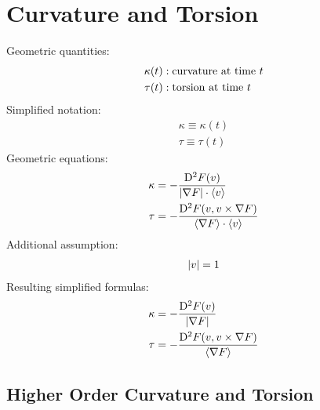 \section{Curvature and Torsion}


Geometric quantities:
\begin{subequations}
\begin{align}
\kappa( t )  &:  \text{curvature at time $ t $}\\
\tau( t )    &:  \text{torsion at time $ t $}
\end{align}
\end{subequations}
Simplified notation:
\begin{subequations}
\begin{align}
\kappa  \equiv  \kappa( t )\\
\tau    \equiv  \tau( t )
\end{align}
\end{subequations}
Geometric equations:
\begin{subequations}
\begin{align}
\kappa   &=   -\frac{ \mathrm{D}^{ 2 }F( v ) }{ \lvert  \nabla F  \rvert \cdot \langle  v  \rangle }\\
\tau     &=   -\frac{ \mathrm{D}^{ 2 }F( v, v \times \nabla F ) }{ \langle  \nabla F  \rangle \cdot \langle  v  \rangle }
\end{align}
\end{subequations}
Additional assumption:
\begin{align}
    \lvert  v  \rvert  =  1
\end{align}
Resulting simplified formulas:
\begin{align}
    \kappa   &=
    - \frac{ \mathrm{D}^{ 2 }F( v ) }{ \lvert  \nabla F  \rvert }  \\
    \tau   &=
    - \frac{ \mathrm{D}^{ 2 }F( v, v \times \nabla F ) }{ \langle  \nabla F  \rangle }
\end{align}


\subsection{Higher Order Curvature and Torsion}



